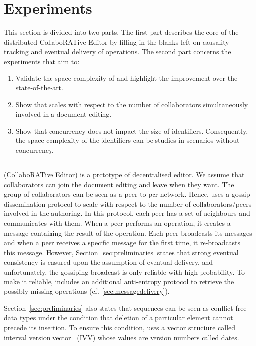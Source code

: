 \section{Experiments}
\label{sec:experiments}

This section is divided into two parts. The first part describes the core of
the distributed CollaboRATive Editor \EDITORNAME{} by filling in the blanks
left on causality tracking and eventual delivery of operations. The second part
concerns the experiments that aim to:

\begin{enumerate}[leftmargin=*]
\item Validate the space complexity of \NAME{} and highlight the improvement
  over the state-of-the-art.
\item Show that \EDITORNAME{} scales with respect to the number of
  collaborators simultaneously involved in a document editing.
\item Show that concurrency does not impact the size of
  identifiers. Consequently, the space complexity of the identifiers can be
  studies in scenarios without concurrency.
\end{enumerate}

\subsection{\EDITORNAME{}}
\label{subsec:crdt}
\EDITORNAME{} (CollaboRATive Editor) is a prototype of decentralised editor. We
assume that collaborators can join the document editing and leave when they
want. The group of collaborators can be seen as a peer-to-per network. Hence,
\EDITORNAME{} uses a gossip dissemination protocol to scale with respect to the
number of collaborators/peers involved in the authoring. In this protocol, each
peer has a set of neighbours and communicates with them. When a peer performs
an operation, it creates a message containing the result of the operation. Each
peer broadcasts its messages and when a peer receives a specific message for
the first time, it re-broadcasts this message. However,
Section~\ref{sec:preliminaries} states that strong eventual consistency is
ensured upon the assumption of eventual delivery, and unfortunately, the
gossiping broadcast is only reliable with high probability. To make it
reliable, \EDITORNAME{} includes an additional anti-entropy protocol to
retrieve the possibly missing operations (cf.~\ref{sec:messagedelivery}).

Section~\ref{sec:preliminaries} also states that sequences can be seen as
conflict-free data types under the condition that deletion of a particular
element cannot precede its insertion. To ensure this condition, \EDITORNAME{}
uses a vector structure called interval version
vector~\cite{mukund2014optimized} (IVV) whose values are version numbers called
dates.

